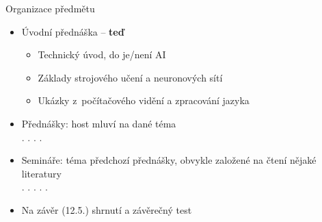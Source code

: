 \begin{frame}{Organizace předmětu}

    \begin{itemize}[<+->]

        \item Úvodní přednáška -- \textbf{teď}

        \begin{itemize}[<+->]

            \item Technický úvod, do je/není AI

            \item Základy strojového učení a neuronových sítí

            \item Ukázky z~počítačového vidění a zpracování jazyka

        \end{itemize}

        \item Přednášky: host mluví na dané téma \\
            . . . . 


        \item Semináře: téma předchozí přednášky, obvykle založené na čtení
            nějaké literatury \\
            . . . . .

        \item Na závěr (12.5.) shrnutí a závěrečný test

    \end{itemize}

    \vspace{10pt}

    \centering

\end{frame}


